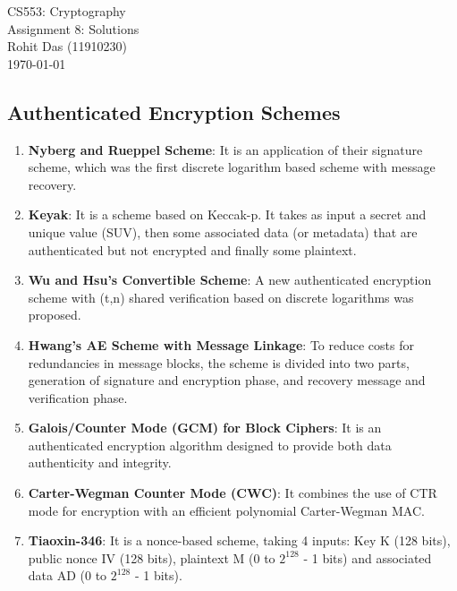 \documentclass[12pt]{article}
\begin{document}
\begin{titlepage}
\centering
\vspace*{\fill}
\huge CS553: Cryptography\\
\LARGE Assignment 8: Solutions\\
\Large Rohit Das (11910230)\\\vspace{0.8cm}
\today
\vspace*{\fill}
\end{titlepage}

\begin{large}

\section{Authenticated Encryption Schemes}

\begin{enumerate}

\item \textbf{Nyberg and Rueppel Scheme}: It is an application of their signature scheme, which was the first discrete logarithm based scheme with message recovery.

\item \textbf{Keyak}: It is a scheme based on Keccak-p. It takes as input a secret and unique value (SUV), then some associated data (or metadata) that are authenticated but not encrypted and finally some plaintext.

\item \textbf{Wu and Hsu's Convertible Scheme}: A new authenticated encryption scheme with (t,n) shared verification based on discrete logarithms was proposed.

\item \textbf{Hwang's AE Scheme with Message Linkage}: To reduce costs for redundancies in message blocks, the scheme is divided into two parts, generation of signature and encryption phase, and recovery message and verification phase.

\item \textbf{Galois/Counter Mode (GCM) for Block Ciphers}: It is an authenticated encryption algorithm designed to provide both data authenticity and integrity.

\item \textbf{Carter-Wegman Counter Mode (CWC)}: It combines the use of CTR mode for encryption with an efficient polynomial Carter-Wegman MAC.

\item \textbf{Tiaoxin-346}: It is a nonce-based scheme, taking 4 inputs: Key K (128 bits), public nonce IV (128 bits), plaintext M (0 to $2 ^ {128}$ - 1 bits) and associated data AD (0 to $2 ^ {128}$ - 1 bits).


\end{enumerate}
\end{large}
\end{document}
